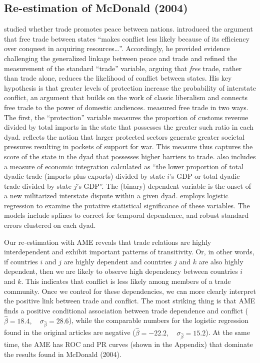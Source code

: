 \documentclass{article}[12pt]
\begin{document}
\subsection{Re-estimation of McDonald (2004)}

\citet{mcdonald:2004} studied whether trade promotes peace between
nations.  \citet[p. 547]{mcdonald:2004} introduced the argument that
free trade between states ``makes conflict less likely
because of its efficiency over conquest in acquiring
resources\ldots''. Accordingly, he provided evidence challenging the
generalized linkage between peace and trade and refined the
measurement of the standard ``trade'' variable, arguing that
\textit{free} trade, rather than trade alone, reduces the likelihood
of conflict between states. His key hypothesis is that greater levels
of protection increase the probability of interstate conflict, an
argument that builds on the work of classic liberalism and connects
free trade to the power of domestic audiences. \citet{mcdonald:2004}
measured free trade in two ways. The first, the ``protection''
variable measures the proportion of customs revenue divided by total
imports in the state that possesses the greater such ratio in each
dyad. reflects the notion that larger protected sectors generate
greater societal pressures resulting in pockets of support for war.
This measure thus captures the score of the state in the dyad that
possesses higher barriers to trade. \citet[p. 560]{mcdonald:2004} also
includes a measure of economic integration  calculated as ``the lower
proportion of total dyadic trade (imports plus exports) divided by
state $i$'s GDP or total dyadic trade divided by state $j$'s
GDP''. The (binary) dependent variable is the onset of a new
militarized interstate dispute within a given dyad.
 \citet{mcdonald:2004} employs logistic regression to examine the
 putative statistical significance of these variables. The models
 include splines to correct for temporal dependence, and robust
 standard errors clustered on each dyad.

Our re-estimation with AME reveals that trade relations are highly interdependent and exhibit important patterns of transitivity.  Or, in other words, if countries $i$ and $j$ are highly dependent and countries $j$ and $k$ are also highly dependent, then we are likely to observe high dependency between countries $i$ and $k$. This indicates that conflict is less likely among members of a trade community. Once we control for these dependencies, we can more clearly interpret the positive link between trade and conflict.  The most striking thing is that AME finds a positive conditional association between trade dependence and conflict ($\hat{\beta}= 18.4, \quad \sigma_{\hat{\beta}} = 28.6$), while the comparable numbers for the logistic regression found in the original articles are negative ($\hat{\beta}= -22.2, \quad \sigma_{\hat{\beta}} = 15.2$). At the same time, the AME has ROC and PR curves (shown in the Appendix) that dominate the results found in McDonald (2004).
\end{document}

